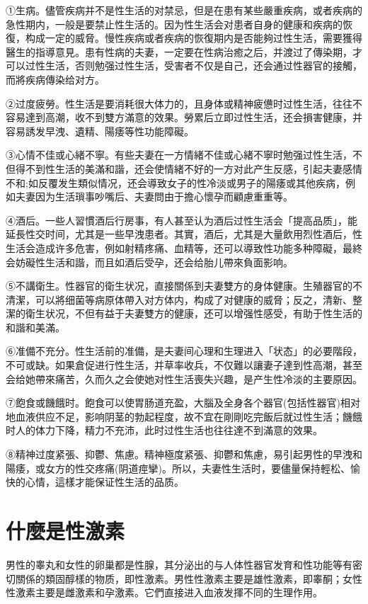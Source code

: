 \documentclass[12pt,UTF8]{ctexbook}
\begin{document}
①生病。儘管疾病并不是性生活的对禁忌，但是在患有某些嚴重疾病，或者疾病的急性期内，一般是要禁止性生活的。因为性生活会对患者自身的健康和疾病的恢復，构成一定的威脅。慢性疾病或者疾病的恢復期内是否能夠过性生活，需要獲得醫生的指導意見。患有性病的夫妻，一定要在性病治癒之后，并渡过了傳染期，才可以过性生活，否则勉强过性生活，受害者不仅是自己，还会通过性器官的接觸，而將疾病傳染给对方。

②过度疲勞。性生活是要消耗很大体力的，且身体或精神疲憊时过性生活，往往不容易達到高潮，收不到雙方滿意的效果。勞累后立即过性生活，还会損害健康，并容易誘发早洩、遺精、陽痿等性功能障礙。

③心情不佳或心緒不寧。有些夫妻在一方情緒不佳或心緒不寧时勉强过性生活，不但得不到性生活的美滿和諧，还会使情緒不好的一方对此产生反感，引起夫妻感情不和;如反覆发生類似情况，还会導致女子的性冷淡或男子的陽痿或其他疾病，例如夫妻因为生活瑣事吵嘴后、夫妻問由于擔心懷孕而顧慮重重等。

④酒后。一些人習慣酒后行房事，有人甚至认为酒后过性生活会「提高品质」，能延長性交时间，尤其是一些早洩患者。其實，酒后，尤其是大量飲用烈性酒后，性生活会造成许多危害，例如射精疼痛、血精等，还可以導致性功能多种障礙，最終会妨礙性生活和諧，而且如酒后受孕，还会给胎儿帶來負面影响。

⑤不講衛生。性器官的衛生状况，直接關係到夫妻雙方的身体健康。生殖器官的不清潔，可以將细菌等病原体帶入对方体内，构成了对健康的威脅；反之，清新、整潔的衛生状况，不但有益于夫妻雙方的健康，还可以增强性感受，有助于性生活的和諧和美滿。

⑥准備不充分。性生活前的准備，是夫妻间心理和生理进入「状态」的必要階段，不可或缺。如果倉促进行性生活，并草率收兵，不仅難以讓妻子達到性高潮，甚至会给她帶來痛苦，久而久之会使她对性生活喪失兴趣，是产生性冷淡的主要原因。

⑦飽食或饑餓时。飽食可以使胃肠道充盈，大腦及全身各个器官(包括性器官)相对地血液供应不足，影响阴茎的勃起程度，故不宜在剛剛吃完飯后就过性生活；饑餓时人的体力下降，精力不充沛，此时过性生活也往往達不到滿意的效果。

⑧精神过度紧張、抑鬱、焦慮。精神極度紧張、抑鬱和焦慮，易引起男性的早洩和陽痿，或女方的性交疼痛(阴道痙攣)。所以，夫妻性生活时，要儘量保持輕松、愉快的心情，這樣才能保证性生活的品质。

\section{什麼是性激素}

男性的睾丸和女性的卵巢都是性腺，其分泌出的与人体性器官发育和性功能等有密切關係的類固醇樣的物质，即性激素。男性性激素主要是雄性激素，即睾酮；女性性激素主要是雌激素和孕激素。它們直接进入血液发揮不同的生理作用。
\end{document}
